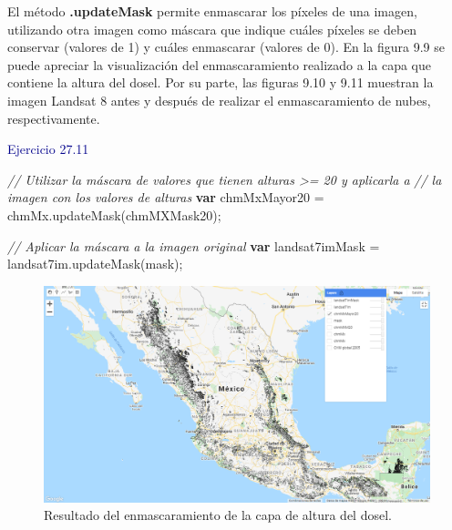\documentclass[
  12pt,
  letterpaper,
  twoside]{book}
\newenvironment{Shaded}{\begin{snugshade}}{\end{snugshade}}
\newcommand{\CommentTok}[1]{\textcolor[rgb]{0.24,0.58,0.00}{\textit{#1}}}
\newcommand{\FunctionTok}[1]{\textcolor[rgb]{0.48,0.12,0.64}{#1}}
\newcommand{\KeywordTok}[1]{\textcolor[rgb]{0.00,0.00,0.00}{\textbf{#1}}}
\newcommand{\NormalTok}[1]{#1}
\newcommand{\OperatorTok}[1]{\textcolor[rgb]{0.00,0.00,0.00}{#1}}
\newcommand\boldpurple[1]{\textcolor{darkpurple}{\textbf{#1}}}
\begin{document}
El método \boldpurple{.updateMask} permite enmascarar los píxeles de una imagen, utilizando otra imagen como máscara que indique cuáles píxeles se deben conservar (valores de 1) y cuáles enmascarar (valores de 0). En la figura 9.9 se puede apreciar la visualización del enmascaramiento realizado a la capa que contiene la altura del dosel. Por su parte, las figuras 9.10 y 9.11 muestran la imagen Landsat 8 antes y después de realizar el enmascaramiento de nubes, respectivamente.

\textcolor{darkblue}{Ejercicio 27.11}

\begin{Shaded}
\begin{Highlighting}[]
\CommentTok{// Utilizar la máscara de valores que tienen alturas \textgreater{}= 20 y aplicarla a }
\CommentTok{// la imagen con los valores de alturas}
\KeywordTok{var}\NormalTok{ chmMxMayor20 }\OperatorTok{=}\NormalTok{ chmMx}\OperatorTok{.}\FunctionTok{updateMask}\NormalTok{(chmMXMask20)}\OperatorTok{;}

\CommentTok{// Aplicar la máscara a la imagen original}
\KeywordTok{var}\NormalTok{ landsat7imMask }\OperatorTok{=}\NormalTok{ landsat7im}\OperatorTok{.}\FunctionTok{updateMask}\NormalTok{(mask)}\OperatorTok{;}
\end{Highlighting}
\end{Shaded}

\begin{figure}[H]

{\centering \includegraphics[width=0.95\linewidth]{Img/ej279} 

}

\caption{Resultado del enmascaramiento de la capa de altura del dosel.}\label{fig:unnamed-chunk-77}
\end{figure}
\end{document}
